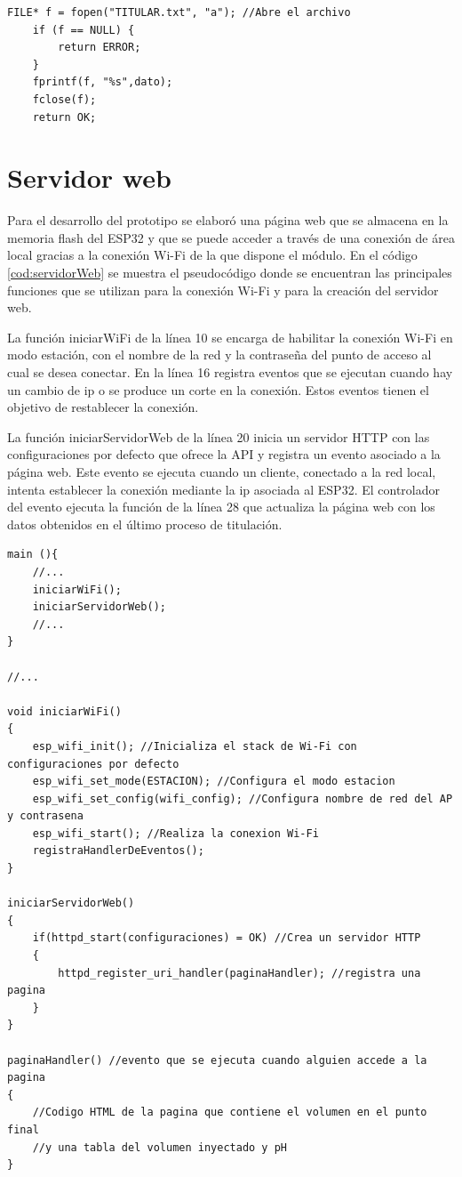 \begin{lstlisting}[label=cod:escribeSD,caption=Pseudocódigo de la función que escribe en la memoria SD.]
    FILE* f = fopen("TITULAR.txt", "a"); //Abre el archivo
    if (f == NULL) {
        return ERROR;
    }
    fprintf(f, "%s",dato);
    fclose(f);
    return OK;
\end{lstlisting}


\section{Servidor web}

Para el desarrollo del prototipo se elaboró una página web que se almacena en la memoria flash del ESP32 y que se puede acceder a través de una conexión de área local gracias a la conexión Wi-Fi de la que dispone el módulo. En el código \ref{cod:servidorWeb} se muestra el pseudocódigo donde se encuentran las principales funciones que se utilizan para la conexión Wi-Fi y para la creación del servidor web.

La función iniciarWiFi de la línea 10 se encarga de habilitar la conexión Wi-Fi en modo estación, con el nombre de la red y la contraseña del punto de acceso al cual se desea conectar. En la línea 16 registra eventos que se ejecutan cuando hay un cambio de ip o se produce un corte en la conexión. Estos eventos tienen el objetivo de restablecer la conexión.

La función iniciarServidorWeb de la línea 20 inicia un servidor HTTP con las configuraciones por defecto que ofrece la API y registra un evento asociado a la página web. Este evento se ejecuta cuando un cliente, conectado a la red local, intenta establecer la conexión mediante la ip asociada al ESP32. El controlador del evento ejecuta la función  de la línea 28 que actualiza la página web con los datos obtenidos en el último proceso de titulación.

\begin{lstlisting}[label=cod:servidorWeb,caption=Pseudocódigo del servidor web.]
main (){
	//...
	iniciarWiFi();
	iniciarServidorWeb();
	//...
}

//...

void iniciarWiFi()
{
	esp_wifi_init(); //Inicializa el stack de Wi-Fi con configuraciones por defecto
	esp_wifi_set_mode(ESTACION); //Configura el modo estacion
	esp_wifi_set_config(wifi_config); //Configura nombre de red del AP y contrasena
	esp_wifi_start(); //Realiza la conexion Wi-Fi
	registraHandlerDeEventos();
}

iniciarServidorWeb()
{
	if(httpd_start(configuraciones) = OK) //Crea un servidor HTTP
	{
		httpd_register_uri_handler(paginaHandler); //registra una pagina
	}
}

paginaHandler() //evento que se ejecuta cuando alguien accede a la pagina
{
	//Codigo HTML de la pagina que contiene el volumen en el punto final
	//y una tabla del volumen inyectado y pH
}

\end{lstlisting}


